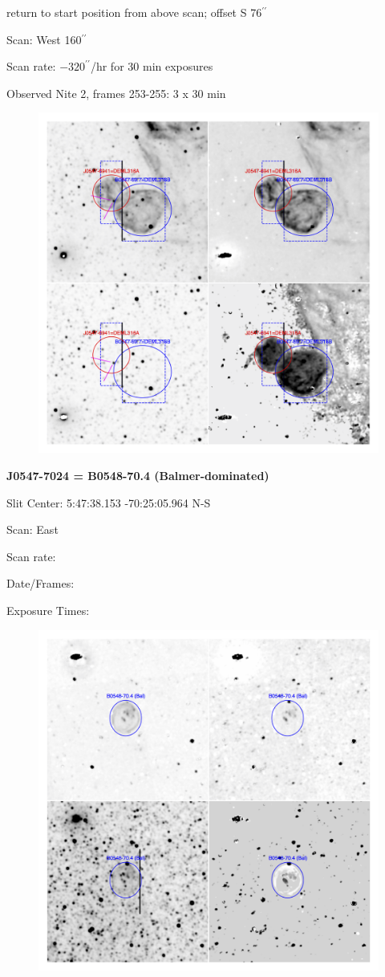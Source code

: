 \documentclass[11pt]{article}
\begin{document}
return to start position from above scan; offset S 76$^{\prime\prime}$

Scan:  West 160$^{\prime\prime}$

Scan rate:  $-320 ^{\prime\prime}$/hr for 30 min exposures

Observed Nite 2, frames 253-255:   3 x 30 min
\begin{figure}
\includegraphics[width=10.cm]{snapshots/DEML316ab.png}
\end{figure}

\newpage 
 
 
{\bf J0547-7024 = B0548-70.4 (Balmer-dominated)}

Slit Center:  5:47:38.153   -70:25:05.964  N-S

Scan:  East

Scan rate:  

Date/Frames:

Exposure Times:  

\begin{figure}
\includegraphics[width=11.cm]{snapshots/B0548-704.png}
\end{figure}
\end{document}
